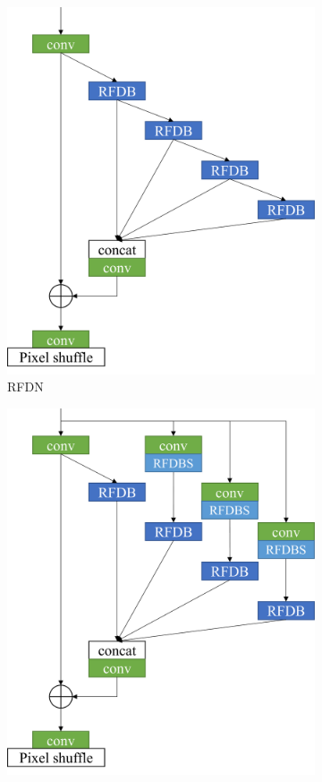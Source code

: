 \documentclass[10pt,twocolumn,letterpaper]{article}
\begin{document}
\begin{figure}
    \centering
    \begin{subfigure}[b]{0.246\linewidth}
		\centering
        \includegraphics[width=\textwidth]{../RFDN.pdf}
        \caption{RFDN}
        \label{fig:RFDN}
    \end{subfigure}
    \begin{subfigure}[b]{0.2476\linewidth}
		\centering
        \includegraphics[width=\textwidth]{../Branching.pdf}

\end{subfigure}
\end{figure}
\end{document}
